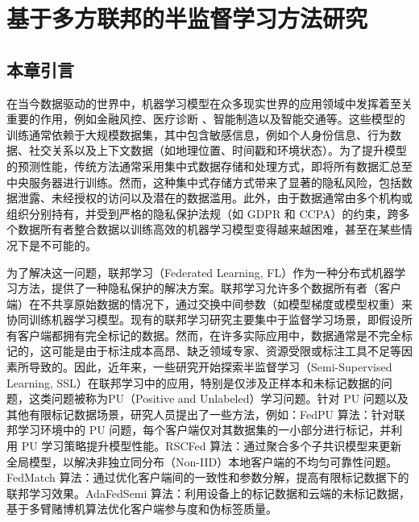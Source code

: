 \chapter{基于多方联邦的半监督学习方法研究} %

\thispagestyle{others} %

\pagestyle{others} %

\xiaosi %


\section{本章引言}
在当今数据驱动的世界中，机器学习模型在众多现实世界的应用领域中发挥着至关重要的作用，例如金融风控\citep{hardt2016equality, rudin2019stop}、医疗诊断 \citep{esteva2017dermatologist, miotto2018deep}、智能制造\citep{lee2015cyber, tao2018digital}以及智能交通\citep{wang2019deep, zhang2019short}等。这些模型的训练通常依赖于大规模数据集，其中包含敏感信息，例如个人身份信息、行为数据、社交关系以及上下文数据（如地理位置、时间戳和环境状态）。为了提升模型的预测性能，传统方法通常采用集中式数据存储和处理方式，即将所有数据汇总至中央服务器进行训练。然而，这种集中式存储方式带来了显著的隐私风险，包括数据泄露、未经授权的访问以及潜在的数据滥用。此外，由于数据通常由多个机构或组织分别持有，并受到严格的隐私保护法规（如 GDPR 和 CCPA）的约束，跨多个数据所有者整合数据以训练高效的机器学习模型变得越来越困难，甚至在某些情况下是不可能的。

为了解决这一问题，联邦学习（Federated Learning, FL）作为一种分布式机器学习方法\citep{mcmahan2017communication}，提供了一种隐私保护的解决方案。联邦学习允许多个数据所有者（客户端）在不共享原始数据的情况下，通过交换中间参数（如模型梯度或模型权重）来协同训练机器学习模型。现有的联邦学习研究主要集中于监督学习场景，即假设所有客户端都拥有完全标记的数据。然而，在许多实际应用中，数据通常是不完全标记的，这可能是由于标注成本高昂、缺乏领域专家、资源受限或标注工具不足等因素所导致的。因此，近年来，一些研究开始探索半监督学习（Semi-Supervised Learning, SSL）在联邦学习中的应用，特别是仅涉及正样本和未标记数据的问题，这类问题被称为PU（Positive and Unlabeled）学习问题。针对 PU 问题以及其他有限标记数据场景，研究人员提出了一些方法，例如：FedPU 算法\citep{lin2022federated}：针对联邦学习环境中的 PU 问题，每个客户端仅对其数据集的一小部分进行标记，并利用 PU 学习策略提升模型性能。RSCFed 算法\citep{liang2022rscfed}：通过聚合多个子共识模型来更新全局模型，以解决非独立同分布（Non-IID）本地客户端的不均匀可靠性问题。FedMatch 算法\citep{jeong2020federated}：通过优化客户端间的一致性和参数分解，提高有限标记数据下的联邦学习效果。AdaFedSemi 算法\citep{wang2022enhancing}：利用设备上的标记数据和云端的未标记数据，基于多臂赌博机算法优化客户端参与度和伪标签质量。

